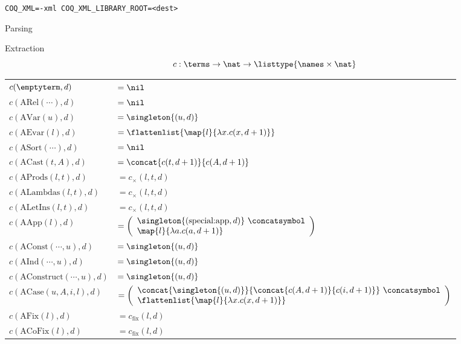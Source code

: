 \documentclass[department=ds, notes={hide notes}, slidesperpage=1]{beamerruhuisstijl}
\begin{document}
\begin{frame}{\xml}
	\lstinline{COQ_XML=-xml COQ_XML_LIBRARY_ROOT=<dest>}
	
\end{frame}

\begin{frame}{Parsing}
	
\end{frame}

\begin{frame}{Extraction}
	\vspace{-2.55em}
	\[c : \terms \rightarrow \nat \rightarrow \listtype{\names \times \nat} \]
	\bigskip
	\hspace{-1.7em}
	\begin{tabularx}{\textwidth}{ll}
		$c(\emptyterm, d)$              & $ = \nil $ \\
		$c(\text{ARel}(\cdots), d)$     & $ = \nil $ \\
		$c(\text{AVar}(u), d)$          & $ = \singleton{(u, d)} $ \\
		$c(\text{AEvar}(l), d)$         & $ = \flattenlist{\map{l}{\lambda x . c(x, d+1)}} $ \\
		$c(\text{ASort}(\cdots), d)$    & $ = \nil $ \\
		$c(\text{ACast}(t, A), d)$      & $ = \concat{c(t, d+1)}{c(A, d+1)} $ \\
		$c(\text{AProds}(l, t), d)$     & $ = c_{\times}(l, t, d) $ \\
		$c(\text{ALambdas}(l, t), d)$   & $ = c_{\times}(l, t, d) $ \\
		$c(\text{ALetIns}(l, t), d)$    & $ = c_{\times}(l, t, d) $ \\
		$c(\text{AApp}(l), d)$  & $ = \left(
		  \begin{array}{l}
			\singleton{(\text{special:app}, d)} ~\concatsymbol \\
			\map{l}{ \lambda a . c(a, d+1) }
		  \end{array}
		  \right)
		  $ \\
		$c(\text{AConst}(\cdots, u), d)$  & $ = \singleton{(u, d)} $ \\
		$c(\text{AInd}(\cdots, u), d)$  & $ = \singleton{(u, d)} $ \\
		$c(\text{AConstruct}(\cdots, u), d)$  & $ = \singleton{(u, d)} $ \\
		$c(\text{ACase}(u, A, i, l), d)$  &
		  $= \left(
			\begin{array}{l}
			  \concat{\singleton{(u, d)}}{
				\concat{c(A, d+1)}{c(i, d+1)}
			  }
			  ~\concatsymbol \\
			  \flattenlist{ \map{l}{\lambda x . c(x, d+1)} } \\
			\end{array}
			\right)
		  $ \\
		$c(\text{AFix}(l), d)$        & $ = c_{\text{fix}}(l, d) $ \\
		$c(\text{ACoFix}(l), d)$      & $ = c_{\text{fix}}(l, d) $ \\
	\end{tabularx}
\end{frame}
\end{document}
